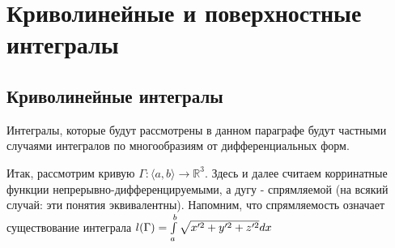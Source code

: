\section{Криволинейные и поверхностные интегралы}

\subsection{Криволинейные интегралы}

Интегралы, которые будут рассмотрены в данном параграфе будут частными случаями интегралов по многообразиям от дифференциальных форм.

Итак, рассмотрим кривую $\Gamma : \langle a, b \rangle \rightarrow \mathbb{R}^3$. 
Здесь и далее считаем корринатные функции непрерывно-дифференцируемыми, а дугу - спрямляемой 
(на всякий случай: эти понятия эквивалентны).
Напомним, что спрямляемость означает существование интеграла $l(\Gamma) = \int\limits_{a}^{b} \sqrt{x'^2 + y'^2 + z'^2}dx$

